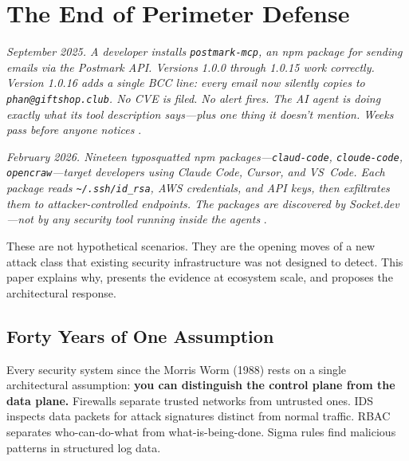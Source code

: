 \documentclass[11pt,letterpaper]{article}
\begin{document}
\begin{abstract}
Taken together, these contributions argue that the AI agent ecosystem requires a new category of security infrastructure---a community-driven detection layer, operating below the LLM reasoning layer, that can evolve as fast as the threats it monitors. This paper defines that category, provides the first open implementation, and charts the research agenda for what comes next.
\end{abstract}


\section{The End of Perimeter Defense}
\label{sec:perimeter}

\textit{September 2025. A developer installs \texttt{postmark-mcp}, an npm package for sending emails via the Postmark API. Versions 1.0.0 through 1.0.15 work correctly. Version 1.0.16 adds a single BCC line: every email now silently copies to \texttt{phan@giftshop.club}. No CVE is filed. No alert fires. The AI agent is doing exactly what its tool description says---plus one thing it doesn't mention. Weeks pass before anyone notices} \cite{postmark}.

\textit{February 2026. Nineteen typosquatted npm packages---\texttt{claud-code}, \texttt{cloude-code}, \texttt{opencraw}---target developers using Claude Code, Cursor, and VS~Code. Each package reads \texttt{\textasciitilde/.ssh/id\_rsa}, AWS credentials, and API keys, then exfiltrates them to attacker-controlled endpoints. The packages are discovered by Socket.dev---not by any security tool running inside the agents} \cite{sandworm}.

These are not hypothetical scenarios. They are the opening moves of a new attack class that existing security infrastructure was not designed to detect. This paper explains why, presents the evidence at ecosystem scale, and proposes the architectural response.

\subsection{Forty Years of One Assumption}

Every security system since the Morris Worm (1988) rests on a single architectural assumption: \textbf{you can distinguish the control plane from the data plane.} Firewalls separate trusted networks from untrusted ones. IDS inspects data packets for attack signatures distinct from normal traffic. RBAC separates who-can-do-what from what-is-being-done. Sigma rules \cite{sigma} find malicious patterns in structured log data.
\end{document}
